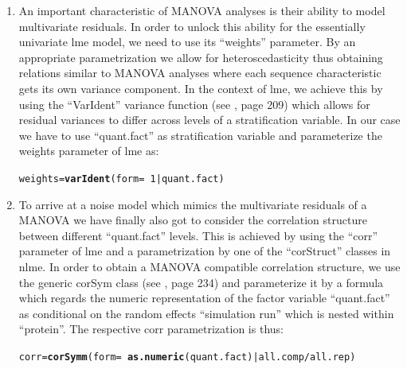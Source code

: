 \documentclass{article}\usepackage[table]{xcolor}
\makeatletter
\newcommand{\hlnum}[1]{\textcolor[rgb]{0.686,0.059,0.569}{#1}}%
\newcommand{\hlopt}[1]{\textcolor[rgb]{0,0,0}{#1}}%
\newcommand{\hlstd}[1]{\textcolor[rgb]{0.345,0.345,0.345}{#1}}%
\newcommand{\hlkwb}[1]{\textcolor[rgb]{0.69,0.353,0.396}{#1}}%
\newcommand{\hlkwc}[1]{\textcolor[rgb]{0.333,0.667,0.333}{#1}}%
\newcommand{\hlkwd}[1]{\textcolor[rgb]{0.737,0.353,0.396}{\textbf{#1}}}%
\newenvironment{kframe}{%
 \def\at@end@of@kframe{}%
 \ifinner\ifhmode%
  \def\at@end@of@kframe{\end{minipage}}%
  \begin{minipage}{\columnwidth}%
 \fi\fi%
 \def\FrameCommand##1{\hskip\@totalleftmargin \hskip-\fboxsep
 \colorbox{shadecolor}{##1}\hskip-\fboxsep
     \hskip-\linewidth \hskip-\@totalleftmargin \hskip\columnwidth}%
 \MakeFramed {\advance\hsize-\width
   \@totalleftmargin\z@ \linewidth\hsize
   \@setminipage}}%
 {\par\unskip\endMakeFramed%
 \at@end@of@kframe}
\newenvironment{knitrout}{}{} %
\renewcommand{\$}{$} %
\makeatother
\begin{document}
\begin{enumerate}
\item An important characteristic of MANOVA analyses is their ability
  to model multivariate residuals. In order to unlock this ability for
  the essentially univariate lme model, we need to use its ``weights''
  parameter. By an appropriate parametrization we allow for heteroscedasticity
  thus obtaining relations similar to MANOVA analyses where
  each sequence characteristic gets its own variance component. In the
  context of lme, we achieve this by using the ``VarIdent'' variance
  function (see \cite{Pinheiro+Bates:2000}, page 209) which allows for
  residual variances to differ across levels of a stratification
  variable. In our case we have to use ``quant.fact'' as
  stratification variable and parameterize the weights parameter of lme
  as:
\begin{knitrout}
\color{fgcolor}\begin{kframe}
\begin{alltt}
\hlstd{weights}\hlkwb{=}\hlkwd{varIdent}\hlstd{(}\hlkwc{form}\hlstd{=}\hlopt{~}\hlnum{1}\hlopt{|}\hlstd{quant.fact)}
\end{alltt}
\end{kframe}
\end{knitrout}

\item To arrive at a noise model which mimics the multivariate
  residuals of a MANOVA we have finally also got to consider the
  correlation structure between different ``quant.fact'' levels. This
  is achieved by using the ``corr'' parameter of lme and a
  parametrization by one of the ``corStruct'' classes in nlme. In
  order to obtain a MANOVA compatible correlation structure, we use
  the generic corSym class (see \cite{Pinheiro+Bates:2000}, page 234)
  and parameterize it by a formula which regards the numeric
  representation of the factor variable ``quant.fact'' as conditional
  on the random effects ``simulation run'' which is nested within
  ``protein''. The respective corr parametrization is thus:
\begin{knitrout}
\color{fgcolor}\begin{kframe}
\begin{alltt}
\hlstd{corr}\hlkwb{=}\hlkwd{corSymm}\hlstd{(}\hlkwc{form}\hlstd{=}\hlopt{~}\hlkwd{as.numeric}\hlstd{(quant.fact)}\hlopt{|}\hlstd{all.comp}\hlopt{/}\hlstd{all.rep)}
\end{alltt}
\end{kframe}
\end{knitrout}
\end{enumerate}
\end{document}
